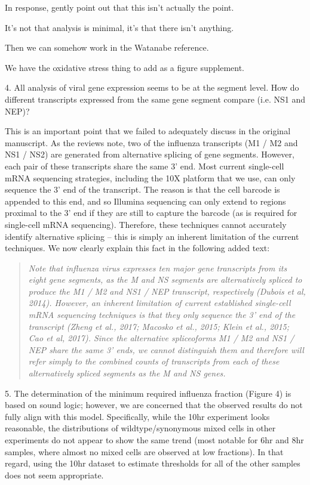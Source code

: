\documentclass[11pt, oneside]{article}   	%
\begin{document}
{\color{red}
In response, gently point out that this isn't actually the point.

It's not that analysis is minimal, it's that there isn't anything.

Then we can somehow work in the Watanabe reference.

We have the oxidative stress thing to add as a figure supplement.
}

4. All analysis of viral gene expression seems to be at the segment level. How do different transcripts expressed from the same gene segment compare (i.e. NS1 and NEP)? 

{\color{black}
This is an important point that we failed to adequately discuss in the original manuscript.
As the reviews note, two of the influenza transcripts (M1 / M2  and NS1 / NS2) are generated from alternative splicing of gene segments.
However, each pair of these transcripts share the same 3' end.
Most current single-cell mRNA sequencing strategies, including the 10X platform that we use, can only sequence the 3' end of the transcript.
The reason is that the cell barcode is appended to this end, and so Illumina sequencing can only extend to regions proximal to the 3' end if they are still to capture the barcode (as is required for single-cell mRNA sequencing).
Therefore, these techniques cannot accurately identify alternative splicing -- this is simply an inherent limitation of the current techniques.
We now clearly explain this fact in the following added text:
\begin{quote}
\textsl{
Note that influenza virus expresses ten major gene transcripts from its eight gene segments, as the M and NS segments are alternatively spliced to produce the M1 / M2 and NS1 / NEP transcript, respectively (Dubois et al, 2014).
However, an inherent limitation of current established single-cell mRNA sequencing techniques is that they only sequence the 3' end of the transcript (Zheng et al., 2017; Macosko et al., 2015; Klein et al., 2015; Cao et al, 2017).
Since the alternative spliceoforms M1 / M2 and NS1 / NEP share the same 3' ends, we cannot distinguish them and therefore will refer simply to the combined counts of transcripts from each of these alternatively spliced segments as the M and NS genes.}
\end{quote}
}

5. The determination of the minimum required influenza fraction (Figure 4) is based on sound logic; however, we are concerned that the observed results do not fully align with this model. Specifically, while the 10hr experiment looks reasonable, the distributions of wildtype/synonymous mixed cells in other experiments do not appear to show the same trend (most notable for 6hr and 8hr samples, where almost no mixed cells are observed at low fractions). In that regard, using the 10hr dataset to estimate thresholds for all of the other samples does not seem appropriate. 
\end{document}

